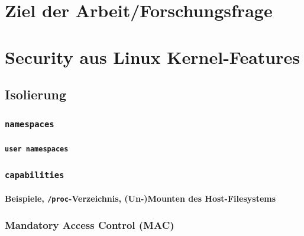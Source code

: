 \documentclass[11pt,a4paper,oneside]{report}
\begin{document}

\chapter{Ziel der Arbeit/Forschungsfrage}
\chapter{Security aus Linux Kernel-Features}
	\section{Isolierung}
		\subsection{\texttt{namespaces}}
    \label{secNamespaces}
			\subsubsection{\texttt{user namespaces}}
		\subsection{\texttt{capabilities}}
			\subsubsection{Beispiele, \texttt{/proc}-Verzeichnis, (Un-)Mounten des Host-Filesystems}
		\subsection{Mandatory Access Control (MAC)}
\end{document}
